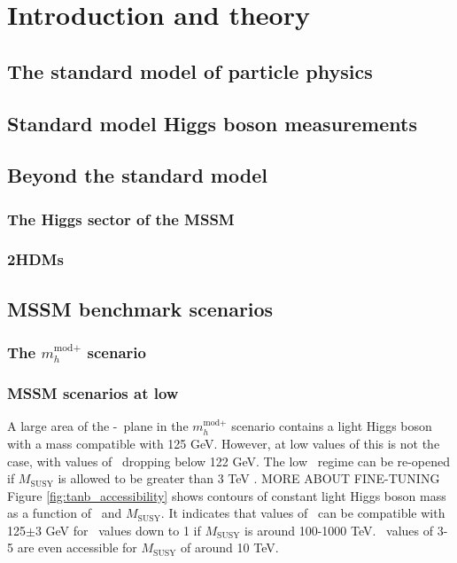\chapter{Introduction and theory}
\label{chap:theory}

\section{The standard model of particle physics}
\label{sec:theory_sm}

\section{Standard model Higgs boson measurements}
\label{sec:theory_smH}

\section{Beyond the standard model}
\label{sec:theory_BSM}

\subsection{The Higgs sector of the MSSM}
\label{sec:theory_MSSM_H}

\subsection{\acl{2HDM}s}
\label{sec:theory_2HDM}

\section{MSSM benchmark scenarios}
\label{sec:theory_BSM_models}

\subsection{The $m_{h}^{\text{mod+}}$ scenario}
\label{sec:theory_BSM_models_mhmodp}

\subsection{MSSM scenarios at low \tanb}
A large area of the \mA-\tanb~plane in the $m_{h}^{\text{mod+}}$ 
scenario contains a light Higgs boson with a mass compatible with
125 GeV. However, at low values of \tanb this is not the case, with
values of \mh~dropping below 122 GeV. The low \tanb~regime can be re-opened
if $M_{\text{SUSY}}$ is allowed to be greater than 3 TeV \cite{MSSM-reopen}. 
MORE ABOUT FINE-TUNING
Figure \ref{fig:tanb_accessibility} shows contours of constant
light Higgs boson mass as a function of \tanb~and $M_{\text{SUSY}}$.
It indicates that values of \mh~can be compatible with 125$\pm$3 GeV
for \tanb~values down to 1 if $M_{\text{SUSY}}$ is around 100-1000 TeV. 
\tanb~values of 3-5 are even accessible for $M_{\text{SUSY}}$ of around 10 TeV.

